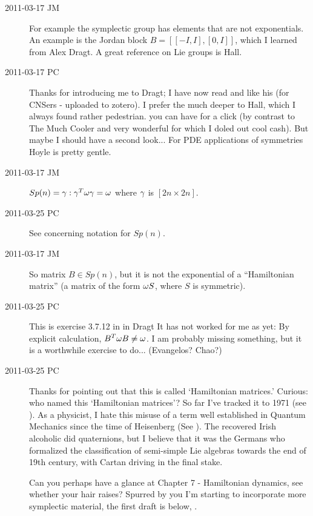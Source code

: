 \begin{description}
\item[2011-03-17 JM]
For example the symplectic group has elements that are not exponentials.
An example is the Jordan block $B=[[-I, I],[0,I]]$, which I learned from
Alex Dragt. A great reference on Lie groups is Hall.

\item[2011-03-17 PC]
Thanks for introducing me to Dragt; I have now read and like his
 (for CNSers - uploaded to zotero). I prefer the much
deeper  to Hall, which I always found rather
pedestrian.  you can have for
a click (by contrast to The Much Cooler and very wonderful
 for which I doled out cool cash). But maybe I should
have a second look... For PDE applications of symmetries
Hoyle is pretty gentle.


\item[2011-03-17 JM]
$Sp(n) = {\gamma :  \gamma^T {\bf \omega} \gamma = {\bf \omega}}$
where $\gamma$ is $[2n\!\times\!2n]$.

\item[2011-03-25 PC]
See  concerning notation for $Sp(n)$.

\item[2011-03-17 JM]
So matrix $B \in Sp(n)$, but it is not the exponential of a
``Hamiltonian matrix'' (a matrix of the form ${\bf \omega}S$, where $S$
is symmetric).

\item[2011-03-25 PC]
This is exercise 3.7.12 in in Dragt
It has not worked for me as yet:
By explicit calculation, $B^T {\bf \omega} B \neq {\bf \omega}$.
I am probably missing something, but it is a worthwhile exercise
to do... (Evangelos? Chao?)

\item[2011-03-25 PC]
Thanks for pointing out that this is called `Hamiltonian matrices.'
Curious: who named this `Hamiltonian matrices'? So far I've tracked it to 1971
(see ).
As a physicist, I hate
this misuse of a term well established in Quantum Mechanics since the
time of Heisenberg (See ). The recovered Irish
alcoholic did quaternions, but I believe that it was the Germans who
formalized the classification of semi-simple Lie algebras towards the end
of 19th century, with Cartan driving in the final stake.

Can you perhaps have a glance at
 {Chapter 7 -
Hamiltonian dynamics}, see whether your hair raises? Spurred by you I'm
starting to incorporate more symplectic material, the first draft is
below, .


\end{description}
